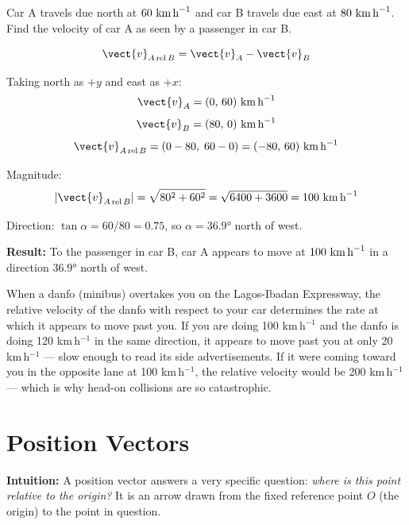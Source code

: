 \begin{examplebox}[2.7]
Car A travels due north at $60\ \text{km\,h}^{-1}$ and
car B travels due east at $80\ \text{km\,h}^{-1}$.
Find the velocity of car A as seen by a passenger
in car B.
\end{examplebox}

\begin{solutionbox}
\[
  \vect{v}_{A\,\text{rel}\,B}
  = \vect{v}_A - \vect{v}_B
\]

Taking north as $+y$ and east as $+x$:
\[
  \vect{v}_A = (0,\, 60)\ \text{km\,h}^{-1}
\]
\[
  \vect{v}_B = (80,\, 0)\ \text{km\,h}^{-1}
\]
\[
  \vect{v}_{A\,\text{rel}\,B}
  = (0 - 80,\; 60 - 0)
  = (-80,\, 60)\ \text{km\,h}^{-1}
\]

Magnitude:
\[
  |\vect{v}_{A\,\text{rel}\,B}|
  = \sqrt{80^2 + 60^2}
  = \sqrt{6400 + 3600} = 100\ \text{km\,h}^{-1}
\]

Direction: $\tan\alpha = 60/80 = 0.75$,
so $\alpha = 36.9°$ north of west.

\textbf{Result:} To the passenger in car B, car A appears
to move at $100\ \text{km\,h}^{-1}$ in a direction
$36.9°$ north of west.
\end{solutionbox}

\begin{realworldbox}
When a danfo (minibus) overtakes you on the Lagos-Ibadan
Expressway, the relative velocity of the danfo with
respect to your car determines the rate at which it
appears to move past you. If you are doing 100 km\,h$^{-1}$
and the danfo is doing 120 km\,h$^{-1}$ in the same
direction, it appears to move past you at only
20 km\,h$^{-1}$ --- slow enough to read its side
advertisements. If it were coming toward you in the
opposite lane at 100 km\,h$^{-1}$, the relative velocity
would be 200 km\,h$^{-1}$ --- which is why head-on
collisions are so catastrophic.
\end{realworldbox}

\section{Position Vectors}
\label{sec:position_vectors}

\textbf{Intuition:} A position vector answers a very
specific question: \textit{where is this point relative
to the origin?} It is an arrow drawn from the fixed
reference point $O$ (the origin) to the point in
question.


